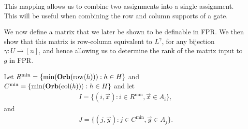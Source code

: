 \documentclass[../paper.tex]{subfiles}
\begin{document}
This mapping allows us to combine two assignments into a single assignment. This
will be useful when combining the row and column supports of a gate.






We now define a matrix that we later be shown to be definable in FPR. We then
show that this matrix is row-column equivalent to $L^{\gamma}$, for any
bijection $\gamma: U \rightarrow [n]$, and hence allowing us to determine the
rank of the matrix input to $g$ in FPR.

Let $R^{\min} = \{\min (\text{\textbf{Orb}}(\text{row}(h))) : h \in H\}$ and $C^{\min} = \{ \min
(\text{\textbf{Orb}} (\text{col}(h))) : h \in H\}$ and let
\begin{align*}
  I = \{(i, \vec{x}): i \in R^{\min}, \vec{x} \in A_i\},
\end{align*}
and
\begin{align*}
  J = \{(j, \vec{y}): j \in C^{\min}, \vec{y} \in A_j \}.
\end{align*}

\end{document}
